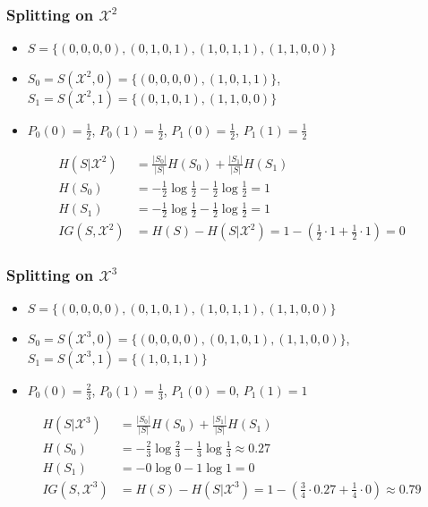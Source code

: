\documentclass[10pt]{beamer}
\begin{document}
\begin{frame}
  \frametitle{Splitting on $\mathcal{X}^2$}
  \begin{itemize}
    \item {\color{red} $S=\{(0,0,0,0),(0,1,0,1),(1,0,1,1),(1,1,0,0)\}$}
    \item $S_0 = S(\mathcal{X}^2,0)=\{(0,0,0,0),(1,0,1,1)\}$, $S_1 = S(\mathcal{X}^2,1)=\{(0,1,0,1),(1,1,0,0)\}$
	\pause
	\item $P_0(0) = \frac 1 2$, $P_0(1) = \frac 1 2$, $P_1(0) = \frac 1 2$, $P_1(1) = \frac 1 2$
  \end{itemize}
  \pause
  \begin{align*}
	H(S|\mathcal{X}^2)&=\frac{|S_0|}{|S|}H(S_0)+\frac{|S_1|}{|S|}H(S_1)\\
	H(S_0)&=-\frac{1}{2}\log\frac{1}{2}-\frac{1}{2}\log\frac{1}{2}=1\\
	H(S_1)&=-\frac{1}{2}\log\frac{1}{2}-\frac{1}{2}\log\frac{1}{2}=1\\
	IG(S,\mathcal{X}^2)&=H(S)-H(S|\mathcal{X}^2)=1 - \left(\frac 1 2 \cdot 1 + \frac 1 2 \cdot 1 \right) = 0
  \end{align*}
\end{frame}

\begin{frame}
  \frametitle{Splitting on $\mathcal{X}^3$}
  \begin{itemize}
    \item {\color{red} $S=\{(0,0,0,0),(0,1,0,1),(1,0,1,1),(1,1,0,0)\}$}
    \item $S_0 = S(\mathcal{X}^3,0)=\{(0,0,0,0),(0,1,0,1),(1,1,0,0)\}$, $S_1 = S(\mathcal{X}^3,1)=\{(1,0,1,1)\}$
	\pause
	\item $P_0(0) = \frac 2 3$, $P_0(1) = \frac 1 3$, $P_1(0) = 0$, $P_1(1) = 1$
  \end{itemize}
  \pause
  \begin{align*}
	H(S|\mathcal{X}^3)&=\frac{|S_0|}{|S|}H(S_0)+\frac{|S_1|}{|S|}H(S_1)\\
	H(S_0)&=-\frac 2 3 \log\frac 2 3 - \frac 1 3 \log\frac 1 3 \approx 0.27\\
	H(S_1)&=-0\log 0- 1\log 1=0\\
	IG(S,\mathcal{X}^3)&=H(S)-H(S|\mathcal{X}^3)=1 - \left(\frac 3 4 \cdot 0.27 + \frac 1 4 \cdot 0 \right) \approx 0.79
  \end{align*}
\end{frame}
\end{document}

